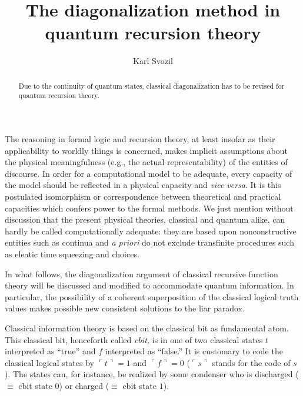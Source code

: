 \documentclass[prl,preprint,showpacs,showkeys,amsfonts,amsmath]{revtex4}
\begin{document}
\title{The diagonalization method in quantum recursion theory}

\author{Karl Svozil}


\begin{abstract}
Due to the continuity of quantum states,
classical diagonalization has to be revised for quantum recursion theory.
\end{abstract}


\maketitle

The reasoning in formal logic and recursion theory,
at least insofar as their applicability to worldly things is concerned,
makes implicit assumptions about the physical
meaningfulness (e.g., the actual representability) of the entities of
discourse.
In order for a computational model to be adequate, every capacity of the model
should be reflected in a physical capacity and {\it vice versa}.
It is this postulated isomorphism or correspondence
between theoretical and practical capacities
which confers power to
the formal methods.
We just mention without discussion that the present physical theories,
classical and quantum alike,
can hardly be called computationally adequate:
they are based upon nonconstructive entities such as continua
and {\it a priori} do not exclude transfinite
procedures such as eleatic time squeezing and choices.

In what follows, the diagonalization argument of classical recursive function theory
will be discussed and modified to accommodate  quantum information.
In particular, the possibility of a coherent superposition
of the classical logical truth values makes possible
new consistent solutions to the liar paradox.

Classical information theory is based on the
classical bit as
fundamental atom. This classical bit, henceforth called
{\em cbit,} is in one of two
classical states $t$ interpreted as ``true'' and $f$
interpreted as ``false.''
It is customary to code the classical logical states by
$\ulcorner t\urcorner =1$ and
$\ulcorner f\urcorner =0$ ($
\ulcorner
s
\urcorner$ stands for the code of $s$).
The states can, for instance, be realized by some
condenser who is discharged ($\equiv$ cbit state $0$) or charged
($\equiv$ cbit state $1$).
\end{document}

